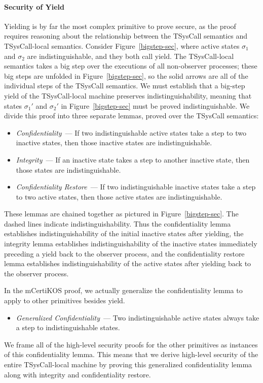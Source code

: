 \paragraph{Security of Yield}
Yielding is by far the most complex primitive to prove secure,
as the proof requires reasoning about the relationship between
the TSysCall semantics and TSysCall-local semantics. Consider
Figure~\ref{bigstep-sec}, where active states $\sigma_1$ and
$\sigma_2$ are indistinguishable, and they both call yield. 
The TSysCall-local semantics takes a big step over the executions 
of all non-observer processes;
these big steps are unfolded in Figure~\ref{bigstep-sec},
so the solid arrows are all of the individual steps of the 
TSysCall semantics. We must establish that a big-step yield
of the TSysCall-local machine preserves indistinguishability, 
meaning that states $\sigma_1'$ and $\sigma_2'$ in 
Figure~\ref{bigstep-sec} must be proved indistinguishable.
We divide this proof into three separate lemmas, proved over 
the TSysCall semantics:
\begin{itemize} \itemsep 0pt
\item \emph{Confidentiality}~--- If two indistinguishable
active states take a step to two inactive states, then those
inactive states are indistinguishable.
\item \emph{Integrity}~--- If an inactive state takes a step
to another inactive state, then those states are 
indistinguishable.
\item \emph{Confidentiality Restore}~--- If two indistinguishable
inactive states take a step to two active states, then those
active states are indistinguishable.
\end{itemize}
These lemmas are chained together as pictured in 
Figure~\ref{bigstep-sec}. The dashed lines indicate
indistinguishability. Thus the confidentiality lemma
establishes indistinguishability of the initial inactive
states after yielding, the integrity lemma establishes
indistinguishability of the inactive states immediately
preceding a yield back to the observer process, and the
confidentiality restore lemma establishes indistinguishability
of the active states after yielding back to the observer process.

\ifextended
In the mCertiKOS proof, we actually generalize the confidentiality
lemma to apply to other primitives besides yield.
\begin{itemize}
\item \emph{Generalized Confidentiality}~--- Two indistinguishable
active states always take a step to indistinguishable states.
\end{itemize}
We frame all of the high-level security proofs for the other
primitives as instances of this confidentiality lemma. This
means that we derive high-level security of the entire TSysCall-local
machine by proving this generalized confidentiality lemma along with 
integrity and confidentiality restore.
\else\fi


